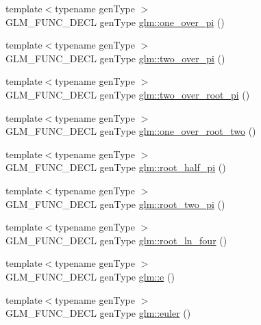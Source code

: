 \begin{DoxyCompactItemize}
\item 
{\footnotesize template$<$typename gen\+Type $>$ }\\G\+L\+M\+\_\+\+F\+U\+N\+C\+\_\+\+D\+E\+C\+L gen\+Type \hyperlink{group__gtc__constants_ga9ba09a027db6d4f4e259b01cf5d6c178}{glm\+::one\+\_\+over\+\_\+pi} ()
\item 
{\footnotesize template$<$typename gen\+Type $>$ }\\G\+L\+M\+\_\+\+F\+U\+N\+C\+\_\+\+D\+E\+C\+L gen\+Type \hyperlink{group__gtc__constants_ga85729d38c47351686e8659f80447a7ea}{glm\+::two\+\_\+over\+\_\+pi} ()
\item 
{\footnotesize template$<$typename gen\+Type $>$ }\\G\+L\+M\+\_\+\+F\+U\+N\+C\+\_\+\+D\+E\+C\+L gen\+Type \hyperlink{group__gtc__constants_ga767e539c20585bf60aa63595b0f0b259}{glm\+::two\+\_\+over\+\_\+root\+\_\+pi} ()
\item 
{\footnotesize template$<$typename gen\+Type $>$ }\\G\+L\+M\+\_\+\+F\+U\+N\+C\+\_\+\+D\+E\+C\+L gen\+Type \hyperlink{group__gtc__constants_gac1a9b3248357fd9e9b740bed90e0b1b7}{glm\+::one\+\_\+over\+\_\+root\+\_\+two} ()
\item 
{\footnotesize template$<$typename gen\+Type $>$ }\\G\+L\+M\+\_\+\+F\+U\+N\+C\+\_\+\+D\+E\+C\+L gen\+Type \hyperlink{group__gtc__constants_gaec5af85e2148c118aad7e797430fdeb0}{glm\+::root\+\_\+half\+\_\+pi} ()
\item 
{\footnotesize template$<$typename gen\+Type $>$ }\\G\+L\+M\+\_\+\+F\+U\+N\+C\+\_\+\+D\+E\+C\+L gen\+Type \hyperlink{group__gtc__constants_gae991b4d39c57b57990054eec3677597c}{glm\+::root\+\_\+two\+\_\+pi} ()
\item 
{\footnotesize template$<$typename gen\+Type $>$ }\\G\+L\+M\+\_\+\+F\+U\+N\+C\+\_\+\+D\+E\+C\+L gen\+Type \hyperlink{group__gtc__constants_ga9cae3fad9314e34c1d3aab71fcdef05f}{glm\+::root\+\_\+ln\+\_\+four} ()
\item 
{\footnotesize template$<$typename gen\+Type $>$ }\\G\+L\+M\+\_\+\+F\+U\+N\+C\+\_\+\+D\+E\+C\+L gen\+Type \hyperlink{group__gtc__constants_gab83fb6de0f05d6c0d11bdf0479f8319e}{glm\+::e} ()
\item 
{\footnotesize template$<$typename gen\+Type $>$ }\\G\+L\+M\+\_\+\+F\+U\+N\+C\+\_\+\+D\+E\+C\+L gen\+Type \hyperlink{group__gtc__constants_ga6f14b46653b7ead1edcbd0fc6c9c5289}{glm\+::euler} ()

\end{DoxyCompactItemize}
